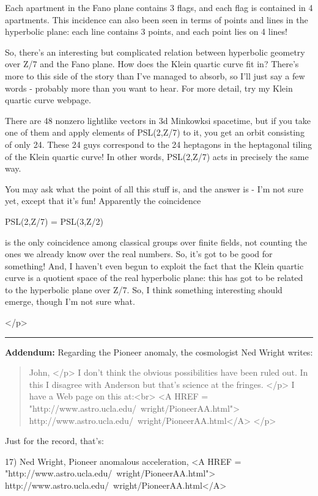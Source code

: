Each apartment in the Fano plane contains 3 flags, and each flag is contained
in 4 apartments.  This incidence can also been seen in terms of points and lines
in the hyperbolic plane: each line contains 3 points, and each point lies on 4
lines!

So, there's an interesting but complicated relation between hyperbolic geometry
over Z/7 and the Fano plane.  How does the Klein quartic curve fit in?   There's
more to this side of the story than I've managed to absorb, so I'll just say a 
few words - probably more than you want to hear.  For more detail, try my Klein
quartic curve webpage.

There are 48 nonzero lightlike vectors in 3d Minkowksi spacetime, but if you
take one of them and apply elements of PSL(2,Z/7) to it, you get an orbit 
consisting of only 24.  These 24 guys correspond to the 24 heptagons in the 
heptagonal tiling of the Klein quartic curve!  In other words, PSL(2,Z/7)
acts in precisely the same way.   

You may ask what the point of all this stuff is, and the answer is - I'm not
sure yet, except that it's fun!  Apparently the coincidence

PSL(2,Z/7) = PSL(3,Z/2)

is the only coincidence among classical groups over finite fields, not
counting the ones we already know over the real numbers.   So, it's got to be
good for something!  And, I haven't even begun to exploit the fact that
the Klein quartic curve is a quotient space of the real hyperbolic plane:
this has got to be related to the hyperbolic plane over Z/7.  So, I think
something interesting should emerge, though I'm not sure what.
                            


</p>\par\noindent\rule{\textwidth}{0.4pt}
\textbf{Addendum:} Regarding the Pioneer anomaly, 
the cosmologist Ned Wright writes:

\begin{quote}
John, 
</p>
I don't think the obvious possibilities have been ruled out.  In this I
disagree with Anderson but that's science at the fringes.
</p>
I have a Web page on this at:<br>
<A HREF = "http://www.astro.ucla.edu/~wright/PioneerAA.html">
http://www.astro.ucla.edu/~wright/PioneerAA.html</A>
</p>
\end{quote}

Just for the record, that's:

17) Ned Wright, Pioneer anomalous acceleration,
<A HREF = "http://www.astro.ucla.edu/~wright/PioneerAA.html">
http://www.astro.ucla.edu/~wright/PioneerAA.html</A>

